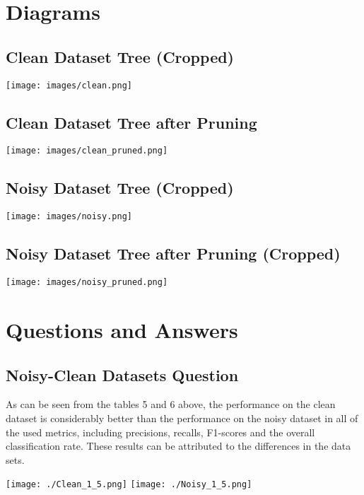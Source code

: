 \documentclass[11pt, a4paper]{article}
\begin{document}
\section{Diagrams}

\subsection{\textbf{Clean Dataset Tree (Cropped)}}

\texttt{[image: images/clean.png]}

\subsection{\textbf{Clean Dataset Tree after Pruning}}

\texttt{[image: images/clean\_pruned.png]}

\subsection{\textbf{Noisy Dataset Tree (Cropped)}}

\texttt{[image: images/noisy.png]}

\subsection{\textbf{Noisy Dataset Tree after Pruning (Cropped)}}

\texttt{[image: images/noisy\_pruned.png]}

\section{Questions and Answers}


\subsection{\textbf{Noisy-Clean Datasets Question}}
  \noindent
  As can be seen from the tables 5 and 6 above, the performance on the
  clean dataset is considerably better than the performance on the
  noisy dataset in all of the used metrics, including precisions,
  recalls, F1-scores and the overall classification rate. These results can
  be attributed to the differences in the data sets.
  \newline\noindent

  \texttt{[image: ./Clean\_1\_5.png]}
  \texttt{[image: ./Noisy\_1\_5.png]}
\end{document}
